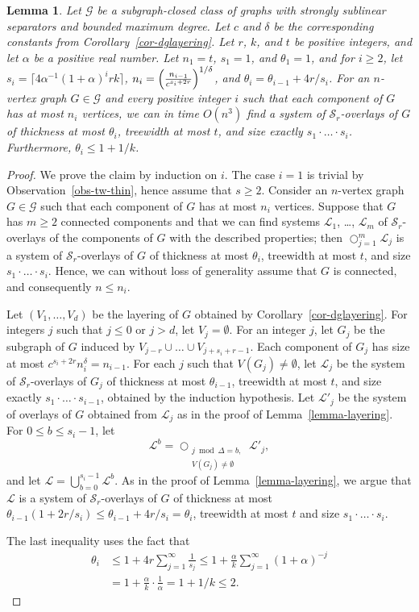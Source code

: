 \documentclass[a4paper,11pt]{article}
\newcommand{\GG}{{\mathcal G}}
\newcommand{\LL}{{\mathcal L}}
\newcommand{\Ss}{{\mathcal S}}
\newtheorem{lemma}[theorem]{Lemma}
\begin{document}
\begin{lemma}\label{lemma-sglaycom}
Let $\GG$ be a subgraph-closed class of graphs with strongly sublinear separators and bounded maximum degree.
Let $c$ and $\delta$ be the corresponding constants from Corollary~\ref{cor-dglayering}.
Let $r$, $k$, and $t$ be positive integers, and let $\alpha$ be a positive real number.
Let $n_1=t$, $s_1=1$, and $\theta_1=1$, and for $i\ge 2$, let $s_i=\lceil 4\alpha^{-1}(1+\alpha)^irk\rceil$, $n_i=\Bigl(\frac{n_{i-1}}{c^{s_i+2r}}\Bigr)^{1/\delta}$, and $\theta_i=\theta_{i-1}+4r/s_i$.
For an $n$-vertex graph $G\in \GG$ and every positive integer $i$ such that each component of $G$ has at most $n_i$ vertices,
we can in time $O(n^3)$ find a system of $\Ss_r$-overlays of $G$ of thickness at most $\theta_i$,
treewidth at most $t$, and size exactly $s_1\cdot\ldots\cdot s_i$.  Furthermore, $\theta_i\le 1+1/k$.
\end{lemma}
\begin{proof}
We prove the claim by induction on $i$.  The case $i=1$ is trivial by Observation~\ref{obs-tw-thin}, hence assume that $s\ge 2$.
Consider an $n$-vertex graph $G\in \GG$ such that each component of $G$ has at most $n_i$ vertices.
Suppose that $G$ has $m\ge 2$ connected components and that we can find systems $\LL_1$, \ldots, $\LL_m$ of $\Ss_r$-overlays 
of the components of $G$ with the described properties; then $\bigcirc_{j=1}^m \LL_j$ is a system of $\Ss_r$-overlays of $G$ of thickness at most $\theta_i$,
treewidth at most $t$, and size $s_1\cdot\ldots\cdot s_i$.  Hence, we can without loss of generality assume that $G$
is connected, and consequently $n\le n_i$.

Let $(V_1,\ldots, V_d)$ be the layering of $G$ obtained by Corollary~\ref{cor-dglayering}.
For integers $j$ such that $j\le 0$ or $j>d$, let $V_j=\emptyset$.  For an integer $j$, let $G_j$ be the subgraph of $G$ induced by
$V_{j-r}\cup \ldots\cup V_{j+s_i+r-1}$.  Each component of $G_j$ has size at most $c^{s_i+2r}n_i^\delta=n_{i-1}$.
For each $j$ such that $V(G_j)\neq\emptyset$, let $\LL_j$ be the system of $\Ss_r$-overlays of $G_j$ of thickness at most $\theta_{i-1}$,
treewidth at most $t$, and size exactly $s_1\cdot\ldots\cdot s_{i-1}$, obtained by the induction hypothesis.
Let $\LL'_j$ be the system of overlays of $G$ obtained from $\LL_j$ as in the proof of Lemma~\ref{lemma-layering}.
For $0\le b\le s_i-1$, let $$\LL^b=\bigcirc_{\substack{j\bmod \Delta=b,\\V(G_j)\neq\emptyset}} \LL'_j,$$
and let $\LL=\bigcup_{b=0}^{s_i-1} \LL^b$.  As in the proof of Lemma~\ref{lemma-layering}, we argue that
$\LL$ is a system of $\Ss_r$-overlays of $G$ of thickness at most $\theta_{i-1}(1+2r/s_i)\le \theta_{i-1}+4r/s_i=\theta_i$,
treewidth at most $t$ and size $s_1\cdot\ldots\cdot s_i$.

The last inequality uses the fact that
\begin{align*}
\theta_i&\le 1+4r\sum_{j=1}^\infty \frac{1}{s_j}\le 1 + \frac{\alpha}{k} \sum_{j=1}^\infty (1+\alpha)^{-j}\\
&=1+\frac{\alpha}{k}\cdot\frac{1}{\alpha}=1+1/k\le 2.
\end{align*}
\end{proof}
\end{document}
